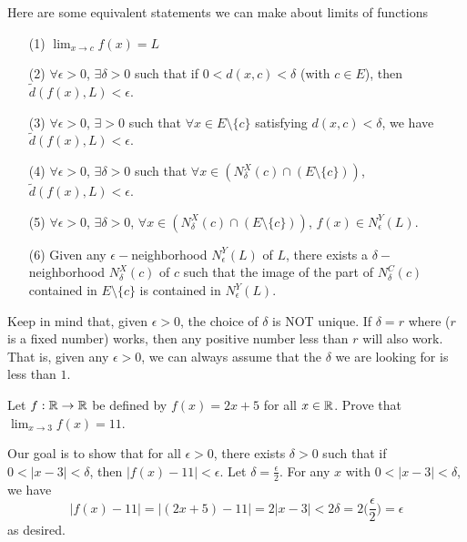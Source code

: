 \documentclass[a4paper]{article}
\begin{document}
Here are some equivalent statements we can make about limits of functions

\begin{enumerate}
    \item[(1)] \( \lim_{ x  \to c  } f(x) = L  \)
    \item[(2)] \( \forall \epsilon > 0  \), \( \exists \delta > 0  \) such that if \( 0 < d(x,c) < \delta \) (with \( c \in E  \)), then \( \tilde{d}(f(x), L) < \epsilon \).
    \item[(3)] \( \forall \epsilon > 0  \), \( \exists > 0  \) such that \( \forall x \in E \setminus  \{ c  \}  \) satisfying \( d(x,c) < \delta \), we have \( \tilde{d}(f(x), L) < \epsilon \).
    \item[(4)] \( \forall \epsilon > 0  \), \( \exists \delta > 0  \) such that \( \forall x \in ({N}_{\delta}^{X}(c) \cap (E \setminus  \{ c \} )) \), \( \tilde{d}(f(x), L) < \epsilon \).
    \item[(5)] \( \forall \epsilon> 0  \), \( \exists \delta > 0  \), \( \forall x \in ({N}_{\delta}^{X}(c) \cap (E \setminus  \{ c \} )) \), \( f(x) \in {N}_{\epsilon}^{Y}(L) \).
    \item[(6)] Given any \( \epsilon- \)neighborhood \( {N}_{\epsilon}^{Y}(L) \) of \( L \), there exists a \( \delta- \)neighborhood \( {N}_{\delta}^{X}(c) \) of \( c  \) such that the image of the part of \( {N}_{\delta}^{C}(c) \) contained in \( E \setminus  \{ c \}  \) is contained in \( {N}_{\epsilon}^{Y}(L) \).
\end{enumerate}

Keep in mind that, given \( \epsilon > 0  \), the choice of \( \delta  \) is NOT unique. If \( \delta = r  \) where (\( r  \) is a fixed number) works, then any positive number less than \( r  \) will also work. That is, given any \( \epsilon > 0  \), we can always assume that the \( \delta  \) we are looking for is less than \( 1  \).

\begin{eg}
    Let \( f: \mathbb{R} \to \mathbb{R}  \) be defined by \( f(x) = 2x + 5  \) for all \( x \in \mathbb{R}  \). Prove that \( \lim_{ x \to 3  } f(x) = 11 \).

    Our goal is to show that for all \( \epsilon > 0  \), there exists \( \delta > 0  \) such that if \( 0 < | x - 3  |  < \delta \), then \( | f(x) - 11  |  < \epsilon  \). Let \( \delta = \frac{ \epsilon  }{  2  }   \). For any \( x  \) with \( 0 < |  x - 3  |  < \delta  \), we have   
    \[  | f(x) - 11  |  =  |  (2x +5) - 11  |  = 2 | x - 3  | < 2 \delta = 2 \Big(  \frac{ \epsilon }{ 2 }  \Big) = \epsilon \]
    as desired.
\end{eg}
\end{document}
